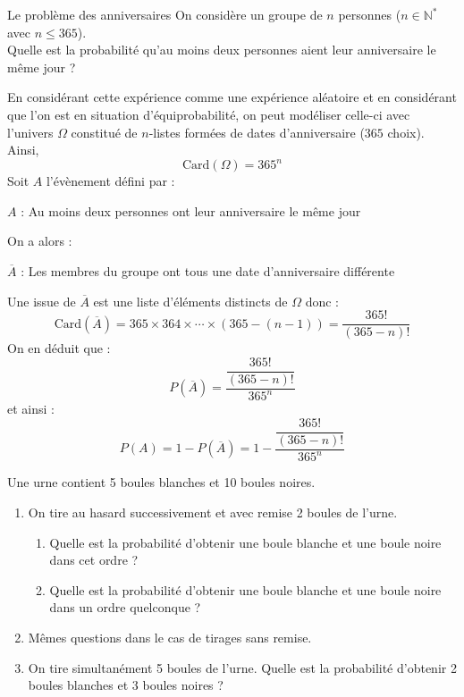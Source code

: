 \documentclass[a4paper,10pt]{report}
\begin{document}
\begin{Exercice}{Le problème des anniversaires}
On considère un groupe de $n$ personnes ($n \in \mathbb{N}^*$ avec $n \leq 365$).\\
Quelle est la probabilité qu'au moins deux personnes aient leur anniversaire le même jour ?
\end{Exercice}

\corr En considérant cette expérience comme une expérience aléatoire et en considérant que l'on est en situation d'équiprobabilité, on peut modéliser celle-ci avec l'univers $\Omega$ constitué de $n$-listes formées de dates d'anniversaire ($365$ choix). Ainsi,
$$ \textrm{Card}(\Omega) = 365^n$$
Soit $A$ l'évènement défini par :

\begin{center}
$A$ : \og Au moins deux personnes ont leur anniversaire le même jour \fg{} 
\end{center}
On a alors :
\begin{center}
$\overline{A}$ : \og Les membres du groupe ont tous une date d'anniversaire différente \fg{} 
\end{center}
Une issue de $\overline{A}$ est une liste d'éléments distincts de $\Omega$ donc :
$$ \textrm{Card}(\overline{A}) = 365 \times 364 \times \cdots \times (365-(n-1)) = \dfrac{365!}{(365-n)!}$$
On en déduit que :
$$ P(\overline{A}) = \dfrac{\dfrac{365!}{(365-n)!}}{365^n}$$
et ainsi :
$$ P(A) = 1- P(\overline{A}) = 1 - \dfrac{\dfrac{365!}{(365-n)!}}{365^n}$$


\begin{Exercice}{} Une urne contient 5 boules blanches et 10 boules noires.

\begin{enumerate}
\item On tire au hasard successivement et avec remise 2 boules de l'urne.
\begin{enumerate}
\item Quelle est la probabilité d'obtenir une boule blanche et une boule noire dans cet ordre ?
\item Quelle est la probabilité d'obtenir une boule blanche et une boule noire dans un ordre quelconque ?
\end{enumerate}
\item Mêmes questions dans le cas de tirages sans remise.
\item On tire simultanément 5 boules de l'urne. Quelle est la probabilité d'obtenir 2 boules blanches et 3 boules noires ?
\end{enumerate}
\end{Exercice}
\end{document}
